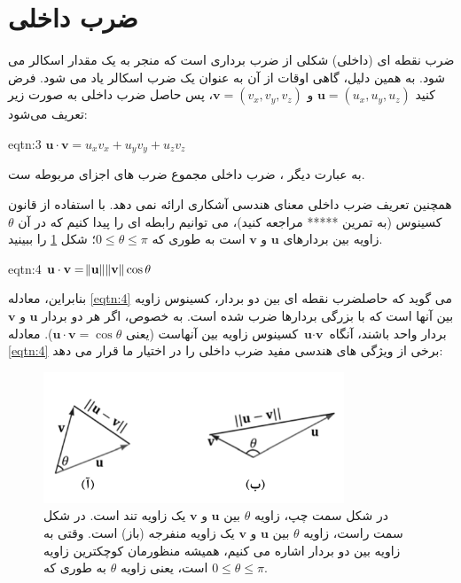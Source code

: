 \section{\textbf{ضرب داخلی}}
\label{sec:3}
{
    \Large
    \begin{spacing}{1.5}
        ضرب نقطه ای (داخلی) شکلی از ضرب برداری است که منجر به یک مقدار اسکالر می شود.
        به همین دلیل، گاهی اوقات از آن به عنوان یک ضرب اسکالر یاد می شود.
        فرض کنید $\textbf{u}=(u_{x},u_{y},u_{z})$ و  $\textbf{v}=(v_{x},v_{y},v_{z})$،
        پس حاصل ضرب داخلی به صورت زیر تعریف می‌شود:

        \begin{eqtn}{eqtn:3}
            \centering
            \LARGE
            $\textbf{u}\cdot\textbf{v}=u_{x}v_{x}+u_{y}v_{y}+u_{z}v_{z}$
        \end{eqtn}

        به عبارت دیگر ، ضرب داخلی مجموع ضرب های اجزای مربوطه ست.

        همچنین تعریف ضرب داخلی معنای هندسی آشکاری ارائه نمی دهد.
        با استفاده از قانون کسینوس (به تمرین ***** مراجعه کنید)، می توانیم رابطه ای را پیدا کنیم که در آن $\theta$ زاویه بین بردارهای $\textbf{u}$ و $\textbf{v}$ است به طوری که $0\leq\theta\leq\pi$؛ شکل \ref{fig:4.Session.1.1.9} را ببینید.

        \begin{eqtn}{eqtn:4}
            \centering
            \LARGE
            $\textbf{u}\cdot\textbf{v}=\norm{\textbf{u}}\norm{\textbf{v}}\cos\theta$
        \end{eqtn}

        بنابراین، معادله \ref{eqtn:4} می گوید که حاصلضرب نقطه ای بین دو بردار، کسینوس زاویه بین آنها است که با بزرگی بردارها ضرب شده است.
        به خصوص، اگر هر دو بردار $\textbf{u}$ و $\textbf{v}$ بردار واحد باشند،
        آنگاه $\textbf{u}\cdot\textbf{v}$ کسینوس زاویه بین آنهاست (یعنی $\textbf{u}\cdot\textbf{v}=\cos\theta$).
        معادله \ref{eqtn:4} برخی از ویژگی های هندسی مفید ضرب داخلی را در اختیار ما قرار می دهد:

        \begin{figure}[H]
            \centering
            \setlength{\belowcaptionskip}{-10pt}
            \includegraphics[width=0.8\textwidth]{Images/4/4.Session.1.1.9}
            \caption{در شکل سمت چپ، زاویه $\theta$ بین $\textbf{u}$ و $\textbf{v}$ یک زاویه تند است.
            در شکل سمت راست، زاویه $\theta$ بین $\textbf{u}$ و $\textbf{v}$ یک زاویه منفرجه (باز) است.
            وقتی به زاویه بین دو بردار اشاره می کنیم، همیشه منظورمان کوچکترین زاویه است،
            یعنی زاویه $\theta$ به طوری که $0\leq\theta\leq\pi$.}
            \label{fig:4.Session.1.1.9}
        \end{figure}


\end{spacing}}
